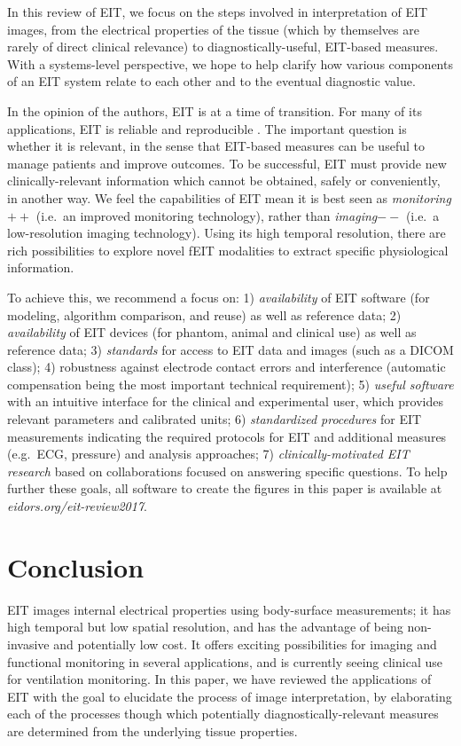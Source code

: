 \documentclass[10pt,journal]{IEEEtran}\def\TBLWIDA{15mm}\def\TBLWIDB{60mm}
\begin{document}
In this review of EIT, we focus
on the steps involved in interpretation
of EIT images, from the electrical properties of the
tissue (which by themselves are rarely of direct
clinical relevance) to diagnostically-useful,
EIT-based measures. With a systems-level perspective,
we hope to help clarify how various components of an EIT system
relate to each other and to the eventual diagnostic value.

In the opinion of the authors, EIT is at a time of transition.
For many of its applications, EIT is reliable
and reproducible \cite{Adler2012Whither, Frerichs2017Chest}. The
important question is whether it is relevant, in the sense that
EIT-based measures can be useful to manage patients and improve outcomes.
To be successful, EIT must provide new clinically-relevant
information which cannot be obtained, safely or conveniently, in another way.
We feel the capabilities of EIT mean it is 
best seen as {\em monitoring$++$}
 (i.e.\ an improved  monitoring technology),
rather than {\em imaging$--$}
 (i.e.\ a low-resolution imaging technology).
Using its high temporal resolution, there are rich possibilities
to explore novel fEIT modalities to extract specific physiological
information.

To achieve this, we recommend a focus on:
1) {\em availability} of EIT software (for modeling, algorithm comparison,
   and reuse) as well as reference data;
2) {\em availability} of EIT devices (for phantom, animal and clinical
   use) as well as reference data;
3) {\em standards} for access to EIT data and images (such as a DICOM class);
4) {\rm robustness} against electrode contact errors and interference
   (automatic compensation being the most important technical 
   requirement);
5) {\em useful software} with an intuitive interface for the clinical
   and experimental user, which provides relevant parameters
   and calibrated units;
6) {\em standardized procedures} for EIT measurements indicating
   the required protocols for EIT and additional measures (e.g.\ 
   ECG, pressure) and analysis approaches;
7) {\em clinically-motivated EIT research} based on collaborations
   focused on answering specific questions.
To help further these goals, all software to create the
figures in this paper is available at {\em eidors.org/eit-review2017}.


\section{Conclusion}

EIT images internal electrical properties using
body-surface measurements; it has high temporal but low
spatial resolution, and has the advantage of being non-invasive
and potentially low cost.
It offers exciting possibilities for imaging and functional 
monitoring in several applications, and is currently
seeing clinical use for ventilation monitoring.
In this paper, we have reviewed the applications of
EIT with the goal to elucidate
the process of image interpretation,
by elaborating each of the processes though which 
potentially diagnostically-relevant measures are determined
from the underlying tissue properties.
\end{document}
